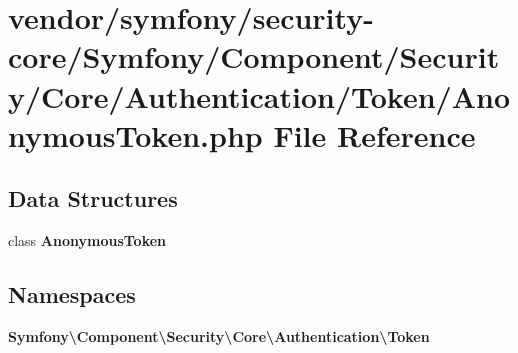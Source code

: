 \section{vendor/symfony/security-\/core/\+Symfony/\+Component/\+Security/\+Core/\+Authentication/\+Token/\+Anonymous\+Token.php File Reference}
\label{_anonymous_token_8php}
\subsection*{Data Structures}
\begin{DoxyCompactItemize}
\item 
class {\bf Anonymous\+Token}
\end{DoxyCompactItemize}
\subsection*{Namespaces}
\begin{DoxyCompactItemize}
\item 
 {\bf Symfony\textbackslash{}\+Component\textbackslash{}\+Security\textbackslash{}\+Core\textbackslash{}\+Authentication\textbackslash{}\+Token}
\end{DoxyCompactItemize}
